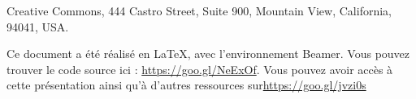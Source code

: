 \par Creative Commons, 444 Castro Street, Suite 900, Mountain View, California, 94041, USA.
\par Ce document a été réalisé en \LaTeX, avec l'environnement Beamer. Vous pouvez trouver le code source ici : \url{https://goo.gl/NeExOf}. Vous pouvez avoir accès à cette présentation ainsi qu'à d'autres ressources sur\url {https://goo.gl/jvzi0s}


